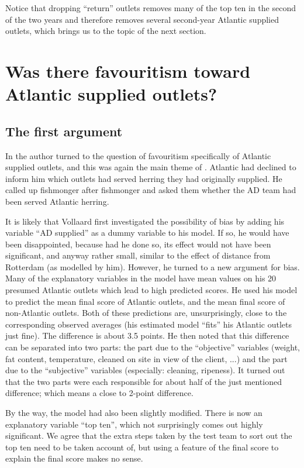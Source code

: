 \documentclass[alpha-refs]{wiley-article}
\begin{document}
Notice that dropping ``return'' outlets removes many of the top ten in the second of the two years and therefore removes several second-year Atlantic supplied outlets, which brings us to the topic of the next section.



\section{Was there favouritism toward Atlantic supplied outlets?}\label{atlantic}

\subsection{The first argument}

In \citet{vollaard2} the author turned to the question of favouritism specifically of Atlantic supplied outlets, and this was again the main theme of  \citet{vollaard2021bias}.  Atlantic had declined to inform him which outlets had served herring they had originally supplied.  He called up fishmonger after fishmonger and asked them whether the AD team had been served Atlantic herring. 

It is likely that Vollaard first investigated the possibility of bias by adding his variable ``AD supplied'' as a dummy variable to his model.  If so, he would have been disappointed, because had he done so, its effect would not have been significant, and anyway rather small, similar to the effect of distance from Rotterdam (as modelled by him).  However, he turned to a new argument for bias. Many of the explanatory variables in the model have mean values on his 20 presumed Atlantic outlets which lead to high predicted scores. He used his model to predict the mean final score of Atlantic outlets, and the mean final score of non-Atlantic outlets. Both of these predictions are, unsurprisingly, close to the corresponding observed averages (his estimated model ``fits'' his Atlantic outlets just fine). The difference is about 3.5 points. He then noted that this difference can be separated into two parts: the part due to the ``objective'' variables (weight, fat content, temperature, cleaned on site in view of the client, ...) and the part due to the ``subjective'' variables (especially: cleaning, ripeness). It turned out that the two parts were each responsible for about half of the just mentioned difference; which means a close to 2-point difference. 

By the way, the model had also been slightly modified. There is now an explanatory variable ``top ten'', which not surprisingly comes out highly significant.  We agree that the extra steps taken by the test team to sort out the top ten need to be taken account of, but using a feature of the final score to explain the final score makes no sense.
\end{document}
